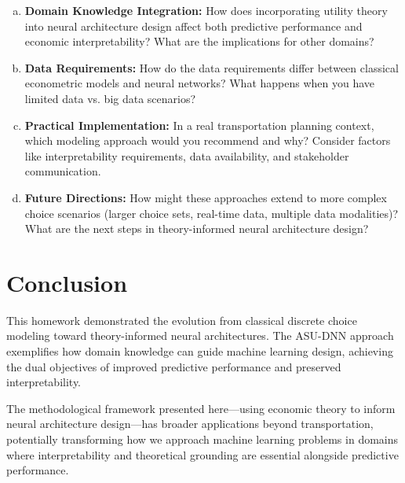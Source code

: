 \documentclass[11pt]{article}
\begin{document}
\begin{enumerate}[(a)]
\item \textbf{Domain Knowledge Integration:} How does incorporating utility theory into neural architecture design affect both predictive performance and economic interpretability? What are the implications for other domains?

\item \textbf{Data Requirements:} How do the data requirements differ between classical econometric models and neural networks? What happens when you have limited data vs. big data scenarios?

\item \textbf{Practical Implementation:} In a real transportation planning context, which modeling approach would you recommend and why? Consider factors like interpretability requirements, data availability, and stakeholder communication.

\item \textbf{Future Directions:} How might these approaches extend to more complex choice scenarios (larger choice sets, real-time data, multiple data modalities)? What are the next steps in theory-informed neural architecture design?
\end{enumerate}

\section*{Conclusion}

This homework demonstrated the evolution from classical discrete choice modeling toward theory-informed neural architectures. The ASU-DNN approach exemplifies how domain knowledge can guide machine learning design, achieving the dual objectives of improved predictive performance and preserved interpretability.

The methodological framework presented here—using economic theory to inform neural architecture design—has broader applications beyond transportation, potentially transforming how we approach machine learning problems in domains where interpretability and theoretical grounding are essential alongside predictive performance.
\end{document}
